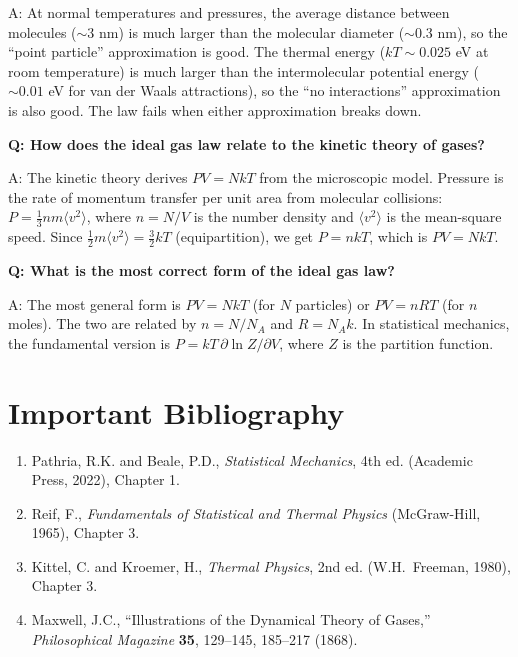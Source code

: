 A: At normal temperatures and pressures, the average distance between molecules ($\sim 3$ nm) is much larger than the molecular diameter ($\sim 0.3$ nm), so the ``point particle'' approximation is good. The thermal energy ($kT \sim 0.025$ eV at room temperature) is much larger than the intermolecular potential energy ($\sim 0.01$ eV for van der Waals attractions), so the ``no interactions'' approximation is also good. The law fails when either approximation breaks down.

\textbf{Q: How does the ideal gas law relate to the kinetic theory of gases?}

A: The kinetic theory derives $PV = NkT$ from the microscopic model. Pressure is the rate of momentum transfer per unit area from molecular collisions: $P = \frac{1}{3}nm\langle v^2\rangle$, where $n = N/V$ is the number density and $\langle v^2\rangle$ is the mean-square speed. Since $\frac{1}{2}m\langle v^2\rangle = \frac{3}{2}kT$ (equipartition), we get $P = nkT$, which is $PV = NkT$.

\textbf{Q: What is the most correct form of the ideal gas law?}

A: The most general form is $PV = NkT$ (for $N$ particles) or $PV = nRT$ (for $n$ moles). The two are related by $n = N/N_A$ and $R = N_Ak$. In statistical mechanics, the fundamental version is $P = kT\,\partial\ln Z/\partial V$, where $Z$ is the partition function.
\section*{Important Bibliography}

\begin{enumerate}
\item Pathria, R.K. and Beale, P.D., \textit{Statistical Mechanics}, 4th ed. (Academic Press, 2022), Chapter 1.
\item Reif, F., \textit{Fundamentals of Statistical and Thermal Physics} (McGraw-Hill, 1965), Chapter 3.
\item Kittel, C. and Kroemer, H., \textit{Thermal Physics}, 2nd ed. (W.H.\ Freeman, 1980), Chapter 3.
\item Maxwell, J.C., ``Illustrations of the Dynamical Theory of Gases,'' \textit{Philosophical Magazine} \textbf{35}, 129--145, 185--217 (1868).
\end{enumerate}

